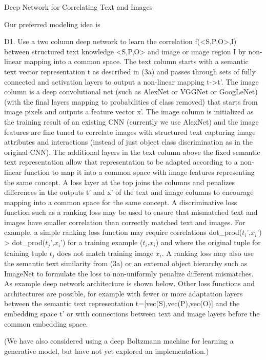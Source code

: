 \documentclass[runningheads]{llncs}
\begin{document}
Deep Network for Correlating Text and Images

Our preferred modeling idea is

D1. Use a two column deep network to learn the correlation f(<S,P,O>,I) between structured text knowledge <S,P,O> and image or image region I by non-linear mapping into a common space.
The text column starts with a semantic text vector representation t as described in (3a) and passes through sets of fully connected and activation layers to output a non-linear mapping t->t’.
The image column is a deep convolutional net (such as AlexNet or VGGNet or GoogLeNet) (with the final layers mapping to probabilities of class removed) that starts from image pixels and outputs a feature vector x’. The image column is initialized as the training result of an existing CNN (currently we use AlexNet) and the image features are fine tuned to correlate images with structured text capturing image attributes and interactions (instead of just object class discrimination as in the original CNN).
The additional layers in the text column above the fixed semantic text representation allow that representation to be adapted according to a non-linear function to map it into a common space with image features representing the same concept.
A loss layer at the top joins the columns and penalizes differences in the outputs t’ and x’ of the text and image columns to encourage mapping into a common space for the same concept. A discriminative loss function such as a ranking loss may be used to ensure that mismatched text and images have smaller correlation than correctly matched text and images. For example, a simple ranking loss function may require correlations dot\_prod($t_i’$,$x_i’$) > dot\_prod($t_j’$,$x_i’$) for a training example ($t_i$,$x_i$) and where the original tuple for training tuple $t_j$ does not match training image $x_i$. A ranking loss may also use the semantic text similarity from (3a) or an external object hierarchy such as ImageNet to formulate the loss to non-uniformly penalize different mismatches.
As example deep network architecture is shown below. Other loss functions and architectures are possible, for example with fewer or more adaptation layers between the semantic text representation t=[vec(S),vec(P),vec(O)] and the embedding space t’ or with connections between text and image layers before the common embedding space.




(We have also considered using a deep Boltzmann machine for learning a generative model, but have not yet explored an implementation.)
\end{document}
